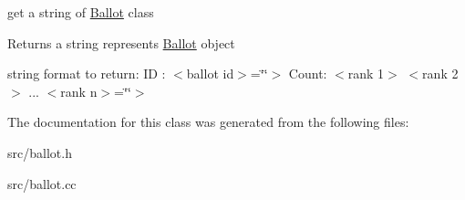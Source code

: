 get a string of \hyperlink{classBallot}{Ballot} class 

\begin{DoxyReturn}{Returns}
a string represents \hyperlink{classBallot}{Ballot} object 
\end{DoxyReturn}
string format to return\+: ID \+: $<$ballot id$>$=\char`\"{}\char`\"{}$>$ Count\+: $<$rank 1$>$ $<$rank 2$>$ ... $<$rank n$>$=\char`\"{}\char`\"{}$>$

The documentation for this class was generated from the following files\+:\begin{DoxyCompactItemize}
\item 
src/ballot.\+h\item 
src/ballot.\+cc\end{DoxyCompactItemize}
